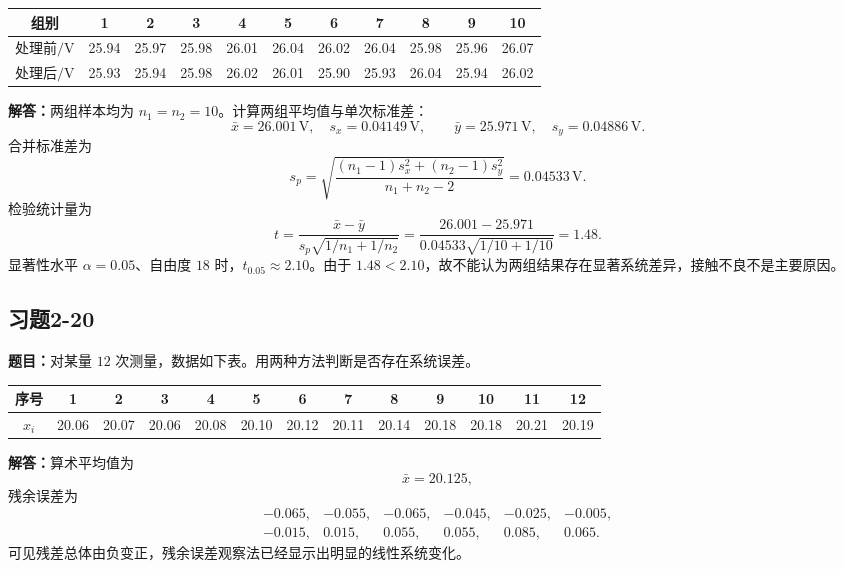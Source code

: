 \documentclass[UTF8,zihao=-4]{ctexart}
\newcommand{\problem}[1]{\subsection*{#1}}
\newcommand{\timu}{\noindent\textbf{题目：}}
\newcommand{\jieda}{\noindent\textbf{解答：}}
\begin{document}
{\begin{center}
\scriptsize
\setlength{\tabcolsep}{4pt}
\begin{tabular}{c|cccccccccc}
\toprule
组别 & 1 & 2 & 3 & 4 & 5 & 6 & 7 & 8 & 9 & 10\\
\midrule
处理前$/\mathrm{V}$ & 25.94 & 25.97 & 25.98 & 26.01 & 26.04 & 26.02 & 26.04 & 25.98 & 25.96 & 26.07\\
处理后$/\mathrm{V}$ & 25.93 & 25.94 & 25.98 & 26.02 & 26.01 & 25.90 & 25.93 & 26.04 & 25.94 & 26.02\\
\bottomrule
\end{tabular}
\end{center}

\jieda 两组样本均为 $n_1=n_2=10$。计算两组平均值与单次标准差：
\begin{equation*}
    \bar{x}=26.001\,\mathrm{V},\quad s_x=0.04149\,\mathrm{V},\qquad
    \bar{y}=25.971\,\mathrm{V},\quad s_y=0.04886\,\mathrm{V}.
\end{equation*}
合并标准差为
\begin{equation*}
    s_p=\sqrt{\frac{(n_1-1)s_x^2+(n_2-1)s_y^2}{n_1+n_2-2}}
    =0.04533\,\mathrm{V}.
\end{equation*}
检验统计量为
\begin{equation*}
    t=\frac{\bar{x}-\bar{y}}{s_p\sqrt{1/n_1+1/n_2}}
    =\frac{26.001-25.971}{0.04533\sqrt{1/10+1/10}}
    =1.48.
\end{equation*}
显著性水平 $\alpha=0.05$、自由度 $18$ 时，$t_{0.05}\approx2.10$。由于 $1.48<2.10$，故不能认为两组结果存在显著系统差异，接触不良不是主要原因。

\problem{习题2-20}
\timu 对某量 $12$ 次测量，数据如下表。用两种方法判断是否存在系统误差。

\begin{center}
\scriptsize
\setlength{\tabcolsep}{4pt}
\begin{tabular}{c|cccccccccccc}
\toprule
序号 & 1 & 2 & 3 & 4 & 5 & 6 & 7 & 8 & 9 & 10 & 11 & 12\\
\midrule
$x_i$ & 20.06 & 20.07 & 20.06 & 20.08 & 20.10 & 20.12 & 20.11 & 20.14 & 20.18 & 20.18 & 20.21 & 20.19\\
\bottomrule
\end{tabular}
\end{center}

\jieda 算术平均值为
\begin{equation*}
    \bar{x}=20.125,
\end{equation*}
残余误差为
\begin{equation*}
\begin{array}{rrrrrr}
-0.065,&-0.055,&-0.065,&-0.045,&-0.025,&-0.005,\\
-0.015,&0.015,&0.055,&0.055,&0.085,&0.065.
\end{array}
\end{equation*}
可见残差总体由负变正，残余误差观察法已经显示出明显的线性系统变化。

}
\end{document}
